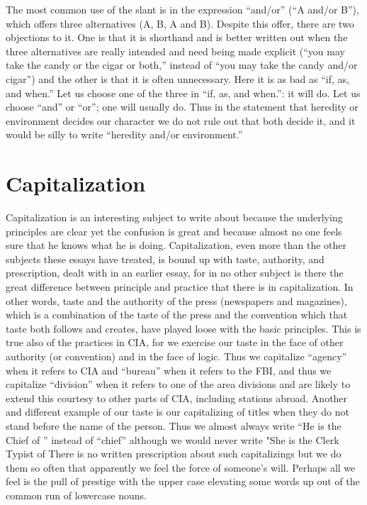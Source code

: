 \documentclass[
    oneside,
    11pt,
    draft
]{memoir}
\begin{document}
The most common use of the slant is in the expression \enquote{and/or} (\enquote{A and/or B}), which offers three alternatives (A, B, A and B). Despite this offer, there are two objections to it. One is that it is shorthand and is better written out when the three alternatives are really intended and need being made explicit (\enquote{you may take the candy or the cigar or both,} instead of \enquote{you may take the candy and/or cigar}) and the other is that it is often unnecessary. Here it is as bad as \enquote{if, as, and when.} Let us choose one of the three in \enquote{if, as, and when.}: it will do. Let us choose \enquote{and} or \enquote{or}; one will usually do. Thus in the statement that heredity or environment decides our character we do not rule out that both decide it, and it would be silly to write \enquote{heredity and/or environment.}

\chapter{Capitalization}

Capitalization is an interesting subject to write about because the underlying principles are clear yet the confusion is great and because almost no one feels sure that he knows what he is doing. Capitalization, even more than the other subjects these essays have treated, is bound up with taste, authority, and prescription, dealt with in an earlier essay, for in no other subject is there the great difference between principle and practice that there is in capitalization. In other words, taste and the authority of the press (newspapers and magazines), which is a combination of the taste of the press and the convention which that taste both follows and creates, have played loose with the basic principles. This is true also of the practices in CIA, for we exercise our taste in the face of other authority (or convention) and in the face of logic. Thus we capitalize \enquote{agency} when it refers to CIA and \enquote{bureau} when it refers to the FBI, and thus we capitalize \enquote{division} when it refers to one of the area divisions and are likely to extend this courtesy to other parts of CIA, including stations abroad. Another and different example of our taste is our capitalizing of titles when they do not stand before the name of the person. Thus we almost always write \enquote{He is the Chief of } instead of \enquote{chief} although we would never write "She is the Clerk Typist of  There is no written prescription about such capitalizings but we do them so often that apparently we feel the force of someone's will. Perhaps all we feel is the pull of prestige with the upper case elevating some words up out of the common run of lowercase nouns.
\end{document}
